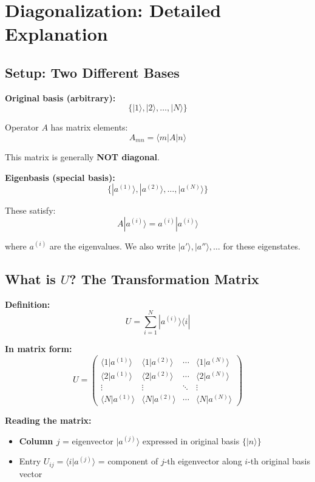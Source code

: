 \documentclass[11pt,a4paper]{article}
\begin{document}
\newpage
\section*{Diagonalization: Detailed Explanation}

\subsection*{Setup: Two Different Bases}

\textbf{Original basis (arbitrary):}
$$\{|1\rangle, |2\rangle, \ldots, |N\rangle\}$$

Operator $A$ has matrix elements:
$$A_{mn} = \langle m|A|n\rangle$$

This matrix is generally \textbf{NOT diagonal}.

\textbf{Eigenbasis (special basis):}
$$\{|a^{(1)}\rangle, |a^{(2)}\rangle, \ldots, |a^{(N)}\rangle\}$$

These satisfy:
$$A|a^{(i)}\rangle = a^{(i)}|a^{(i)}\rangle$$

where $a^{(i)}$ are the eigenvalues. We also write $|a'\rangle, |a''\rangle, \ldots$ for these eigenstates.

\subsection*{What is $U$? The Transformation Matrix}

\textbf{Definition:}
$$\boxed{U = \sum_{i=1}^N |a^{(i)}\rangle\langle i|}$$

\textbf{In matrix form:}
$$U = \begin{pmatrix}
\langle 1|a^{(1)}\rangle & \langle 1|a^{(2)}\rangle & \cdots & \langle 1|a^{(N)}\rangle \\
\langle 2|a^{(1)}\rangle & \langle 2|a^{(2)}\rangle & \cdots & \langle 2|a^{(N)}\rangle \\
\vdots & \vdots & \ddots & \vdots \\
\langle N|a^{(1)}\rangle & \langle N|a^{(2)}\rangle & \cdots & \langle N|a^{(N)}\rangle
\end{pmatrix}$$

\textbf{Reading the matrix:}
\begin{itemize}
\item \textbf{Column $j$} = eigenvector $|a^{(j)}\rangle$ expressed in original basis $\{|n\rangle\}$
\item Entry $U_{ij} = \langle i|a^{(j)}\rangle$ = component of $j$-th eigenvector along $i$-th original basis vector
\end{itemize}
\end{document}
